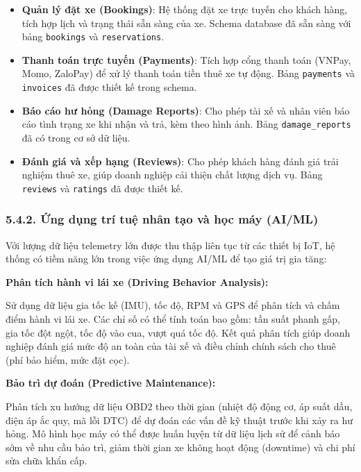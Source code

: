 \documentclass[13pt,a4paper]{extarticle}
\renewcommand{\\}{\thesislongtableorignewline\hline}%
\providecommand{\tightlist}{%
  \setlength{\itemsep}{0pt}\setlength{\parskip}{0pt}}
\begin{document}
\begin{itemize}
\tightlist
\item
  \textbf{Quản lý đặt xe (Bookings)}: Hệ thống đặt xe trực tuyến cho
  khách hàng, tích hợp lịch và trạng thái sẵn sàng của xe. Schema
  database đã sẵn sàng với bảng \texttt{bookings} và
  \texttt{reservations}.
\item
  \textbf{Thanh toán trực tuyến (Payments)}: Tích hợp cổng thanh toán
  (VNPay, Momo, ZaloPay) để xử lý thanh toán tiền thuê xe tự động. Bảng
  \texttt{payments} và \texttt{invoices} đã được thiết kế trong schema.
\item
  \textbf{Báo cáo hư hỏng (Damage Reports)}: Cho phép tài xế và nhân
  viên báo cáo tình trạng xe khi nhận và trả, kèm theo hình ảnh. Bảng
  \texttt{damage\_reports} đã có trong cơ sở dữ liệu.
\item
  \textbf{Đánh giá và xếp hạng (Reviews)}: Cho phép khách hàng đánh giá
  trải nghiệm thuê xe, giúp doanh nghiệp cải thiện chất lượng dịch vụ.
  Bảng \texttt{reviews} và \texttt{ratings} đã được thiết kế.
\end{itemize}

\subsubsection{5.4.2. Ứng dụng trí tuệ nhân tạo và học máy
(AI/ML)}\label{542-ux1ee9ng-dux1ee5ng-truxed-tuux1ec7-nhuxe2n-tux1ea1o-vuxe0-hux1ecdc-muxe1y-aiml}

Với lượng dữ liệu telemetry lớn được thu thập liên tục từ các thiết bị
IoT, hệ thống có tiềm năng lớn trong việc ứng dụng AI/ML để tạo giá trị
gia tăng:

\textbf{Phân tích hành vi lái xe (Driving Behavior Analysis):}

Sử dụng dữ liệu gia tốc kế (IMU), tốc độ, RPM và GPS để phân tích và
chấm điểm hành vi lái xe. Các chỉ số có thể tính toán bao gồm: tần suất
phanh gấp, gia tốc đột ngột, tốc độ vào cua, vượt quá tốc độ. Kết quả
phân tích giúp doanh nghiệp đánh giá mức độ an toàn của tài xế và điều
chỉnh chính sách cho thuê (phí bảo hiểm, mức đặt cọc).

\textbf{Bảo trì dự đoán (Predictive Maintenance):}

Phân tích xu hướng dữ liệu OBD2 theo thời gian (nhiệt độ động cơ, áp
suất dầu, điện áp ắc quy, mã lỗi DTC) để dự đoán các vấn đề kỹ thuật
trước khi xảy ra hư hỏng. Mô hình học máy có thể được huấn luyện từ dữ
liệu lịch sử để cảnh báo sớm về nhu cầu bảo trì, giảm thời gian xe không
hoạt động (downtime) và chi phí sửa chữa khẩn cấp.
\end{document}
